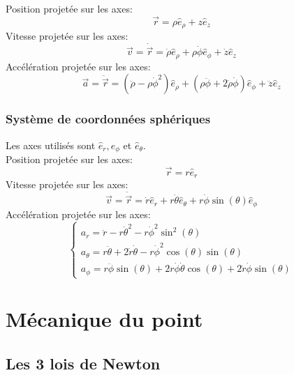 \documentclass{article}
\numberwithin{equation}{section}
\begin{document}
Position projetée sur les axes:
\begin{equation}
	\boxed{\vec r = \rho \hat e_\rho + z \hat e_z}
\end{equation}
Vitesse projetée sur les axes:
\begin{equation}
	\boxed{\vec v = \dot{\vec{r}} = \dot \rho \hat e_\rho + \rho \dot \phi \hat e_\phi + \dot z \hat e_z}
\end{equation}
Accélération projetée sur les axes:
\begin{equation}
	\boxed{\vec a = \ddot{\vec{r}}	= \left (\ddot \rho - \rho \dot \phi^2 \right ) \hat e_\rho
					 						+ \left (\rho \ddot \phi + 2 \dot \rho \dot \phi \right ) \hat e_\phi
					 						+ \ddot z \hat e_z}
\end{equation}

\subsubsection{Système de coordonnées sphériques}
Les axes utilisés sont \(\hat e_r, \hat e_\phi\) et \(\hat e_\theta\). \\
Position projetée sur les axes:
\begin{equation}
	\boxed{\vec r = r \hat e_r}
\end{equation}
Vitesse projetée sur les axes:
\begin{equation}
	\boxed{\vec v = \dot{\vec{r}} = \dot r \hat e_r + r \dot \theta \hat e_\theta + r \dot \phi \sin(\theta) \hat e_\phi}
\end{equation}
Accélération projetée sur les axes:
\begin{equation}
	\boxed{\begin{cases}
	a_r 		= \ddot r - r \dot \theta^2 - r \dot \phi^2 \sin^2(\theta) \\
	a_\theta	= r \ddot \theta + 2 \dot r \dot \theta - r \dot \phi^2 \cos(\theta)\sin(\theta) \\
	a_\phi		= r \ddot \phi \sin(\theta) + 2r \dot \phi \dot \theta \cos(\theta) + 2 \dot r \dot \phi \sin(\theta)
	\end{cases}}
\end{equation}

\section{Mécanique du point}

\subsection{Les 3 lois de Newton}
\end{document}

